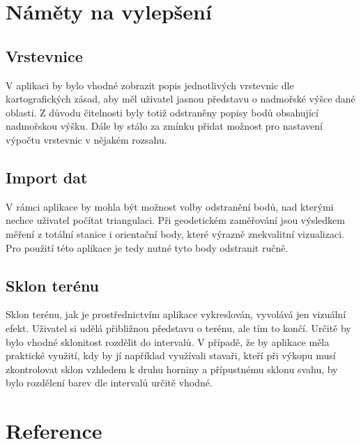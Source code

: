 \documentclass[a4paper, 12pt]{article}
\begin{document}
\section{Náměty na vylepšení}
\subsection{Vrstevnice}
V aplikaci by bylo vhodné zobrazit popis jednotlivých vrstevnic dle kartografických zásad, aby měl uživatel jasnou představu o nadmořské výšce dané oblasti. Z důvodu čitelnosti byly totiž odstraněny popisy bodů obsahující nadmořskou výšku. Dále by stálo za zmínku přidat možnost pro nastavení výpočtu vrstevnic v nějakém rozsahu.\\

\subsection{Import dat}
V rámci aplikace by mohla být možnost volby odstranění bodů, nad kterými nechce uživatel počítat triangulaci. Při geodetickém zaměřování jsou výsledkem měření z totální stanice i orientační body, které výrazně znekvalitní vizualizaci. Pro použití této aplikace je tedy nutné tyto body odstranit ručně.

\subsection{Sklon terénu}
Sklon terénu, jak je prostřednictvím aplikace vykreslován, vyvolává jen vizuální efekt. Uživatel si udělá přibližnou představu o terénu, ale tím to končí. Určitě by bylo vhodné sklonitost rozdělit do intervalů. V případě, že by aplikace měla praktické využití, kdy by jí například využívali stavaři, kteří při výkopu musí zkontrolovat sklon vzhledem k druhu horniny a přípustnému sklonu svahu, by bylo rozdělení barev dle intervalů určitě vhodné.



\clearpage
\section{Reference}
\end{document}
